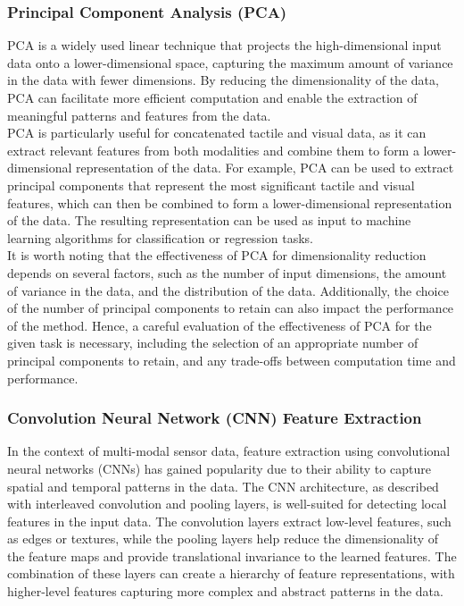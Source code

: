 \documentclass[11pt, a4paper]{report}
\begin{document}
\subsubsection{Principal Component Analysis (PCA)}
\label{sec:4.4.2.1}
PCA is a widely used linear technique that projects the high-dimensional input data onto a lower-dimensional space, capturing the maximum amount of variance in the data with fewer dimensions. By reducing the dimensionality of the data, PCA can facilitate more efficient computation and enable the extraction of meaningful patterns and features from the data.\\

PCA is particularly useful for concatenated tactile and visual data, as it can extract relevant features from both modalities and combine them to form a lower-dimensional representation of the data. For example, PCA can be used to extract principal components that represent the most significant tactile and visual features, which can then be combined to form a lower-dimensional representation of the data. The resulting representation can be used as input to machine learning algorithms for classification or regression tasks.\\

It is worth noting that the effectiveness of PCA for dimensionality reduction depends on several factors, such as the number of input dimensions, the amount of variance in the data, and the distribution of the data. Additionally, the choice of the number of principal components to retain can also impact the performance of the method. Hence, a careful evaluation of the effectiveness of PCA for the given task is necessary, including the selection of an appropriate number of principal components to retain, and any trade-offs between computation time and performance.


\subsubsection{Convolution Neural Network (CNN) Feature Extraction}
\label{sec:4.4.2.2}
In the context of multi-modal sensor data, feature extraction using convolutional neural networks (CNNs) has gained popularity due to their ability to capture spatial and temporal patterns in the data. The CNN architecture, as described with interleaved convolution and pooling layers, is well-suited for detecting local features in the input data. The convolution layers extract low-level features, such as edges or textures, while the pooling layers help reduce the dimensionality of the feature maps and provide translational invariance to the learned features. The combination of these layers can create a hierarchy of feature representations, with higher-level features capturing more complex and abstract patterns in the data.
\end{document}
